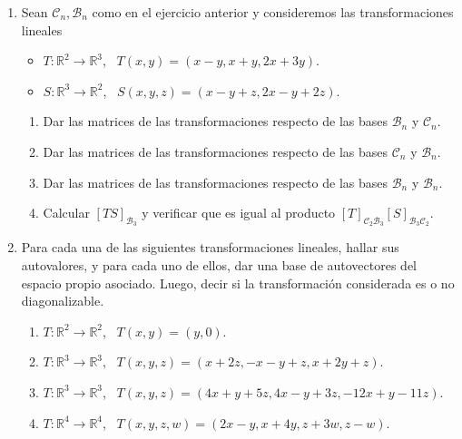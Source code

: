 \documentclass[12pt]{amsart}
\begin{document}
\begin{enumerate}
	\item \label{lineales1} 
	Sean $\mathcal{C}_n, \mathcal{B}_n$ como en el ejercicio anterior y consideremos las  transformaciones lineales
	\begin{itemize}
	 	\item $T:\mathbb{R}^2 \longrightarrow \mathbb{R}^3$, \ $T(x,y)=(x-y,x+y,2x+3y)$.
		\item $S:\mathbb{R}^3 \longrightarrow \mathbb{R}^2$, \ $S(x,y,z)=(x-y+z,2x-y+2z)$.
	\end{itemize}
	\begin{enumerate}
		\item Dar las matrices de las transformaciones respecto de las bases $\mathcal{B}_n$ y
		$\mathcal{C}_n$.
		\item Dar las matrices de las transformaciones  respecto de las bases $\mathcal{C}_n$ y
		$\mathcal{B}_n$.
		\item Dar las matrices de las transformaciones  respecto de las bases $\mathcal{B}_n$ y
		$\mathcal{B}_n$.
		\item Calcular $[TS]_{\mathcal{B}_3}$ y verificar que es igual al producto $[T]_{\mathcal{C}_2\mathcal{B}_3}[S]_{\mathcal{B}_3\mathcal{C}_2}$.
	\end{enumerate}
	    \item Para cada una de las siguientes transformaciones lineales, hallar sus autovalores,
	y para cada uno de ellos, dar una base de autovectores del espacio propio asociado. Luego, decir si la
	transformaci\'on considerada es o no  diagonalizable.
	\begin{enumerate}
		\item $T:\mathbb{R}^2\to \mathbb{R}^2$, \ $T(x,y)=(y,0)$.
		\item $T:\mathbb{R}^3\to \mathbb{R}^3$, \ $T(x,y,z)=(x+2z,-x-y+z,x+2y+z)$.
		\item $T:\mathbb{R}^3\to \mathbb{R}^3$, \ $T(x,y,z)=(4x+y+5z,4x-y+3z,-12x+y-11z)$.
        \item $T:\mathbb{R}^4\to \mathbb{R}^4$, \ $T(x,y,z,w)=(2x-y,x+4y,z+3w,z-w)$.
	\end{enumerate}
		

\end{enumerate}
\end{document}
